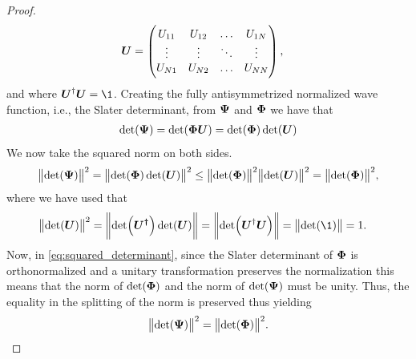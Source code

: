 \begin{proof}
\begin{align}
                \boldsymbol{U}
                &= \begin{pmatrix}
                    U_{11} & U_{12} & \dots & U_{1N} \\
                    \vdots & \vdots & \ddots & \vdots \\
                    U_{N1} & U_{N2} & \dots & U_{NN}
                \end{pmatrix},
            \end{align}
            and where $\vfg{U}^{\dagger}\vfg{U} = \1$.
            Creating the fully antisymmetrized normalized wave function, i.e.,
            the Slater determinant, from $\boldsymbol{\Psi}$ and $\boldsymbol{\Phi}$ we have
            that
            \begin{gather}
                \det(\boldsymbol{\Psi}) = \det(\boldsymbol{\Phi}\boldsymbol{U})
                = \det(\boldsymbol{\Phi})\det(\boldsymbol{U})
            \end{gather}
            We now take the squared norm on both sides.
            \begin{align}
                \norm{\det(\boldsymbol{\Psi})}^2
                = \norm{\det(\boldsymbol{\Phi})\det(\boldsymbol{U})}^2
                \leq
                \norm{\det(\boldsymbol{\Phi})}^2\norm{\det(\boldsymbol{U})}^2
                = \norm{\det(\boldsymbol{\Phi})}^2,
                \label{eq:squared_determinant}
            \end{align}
            where we have used that
            \begin{align}
                \norm{\det(\vfg{U})}^2
                &= \norm{\det(\vfg{U^{\dagger}})\det(\vfg{U})}
                = \norm{\det(\vfg{U}^{\dagger}\vfg{U})}
                = \norm{\det(\1)} = 1.
            \end{align}
            Now, in \autoref{eq:squared_determinant}, since the Slater
            determinant of $\boldsymbol{\Phi}$ is orthonormalized and a unitary
            transformation preserves the normalization this means that the norm
            of $\det(\boldsymbol{\Phi})$ and the norm of $\det(\boldsymbol{\Psi})$ must be
            unity.  Thus, the equality in the splitting of the norm is preserved
            thus yielding
            \begin{gather}
                \norm{\det(\boldsymbol{\Psi})}^2 = \norm{\det(\boldsymbol{\Phi})}^2.
            \end{gather}
        \end{proof}

